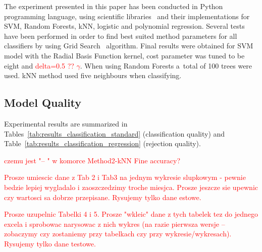 \documentclass{llncs}
\begin{document}
The experiment presented in this paper has been conducted in Python programming language, using scientific libraries~\cite{NumPy,Scikit} and their implementations for SVM, Random Forests, kNN, logistic and polynomial regression. Several tests have been performed in order to find best suited method parameters for all classifiers by using Grid Search~\cite{Scikit} algorithm. Final results were obtained for SVM model with the Radial Basis Function kernel, cost parameter was tuned to be eight and \textcolor{red}{delta=0.5 ?? $\gamma$}. When using Random Forests a~total of 100 trees were used. kNN method used five neighbours when classifying. 


\subsection{Model Quality}
	\label{subsec:rejection_quality}

Experimental results are summarized in Tables~\ref{tab:results_classification_standard} (classification quality) and Table~\ref{tab:results_classification_regression} (rejection quality). 

\textcolor{red}{czemu jest "-- " w komorce Method2-kNN Fine accuracy?}

\textcolor{red}{Prosze umiescic dane z Tab 2 i Tab3 na jednym wykresie slupkowym - pewnie bedzie lepiej wygladalo i zaoszczedzimy troche miesjca. Prosze jeszcze sie upewnic czy wartosci sa dobrze przepisane. Rysujemy tylko dane estowe.}

\textcolor{red}{Prosze uzupelnic Tabelki 4 i 5. Prosze "wkleic" dane z tych tabelek tez do jednego excela i sprobowac narysowac z nich wykres (na razie pierwsza wersje -- zobaczymy czy zostaniemy przy tabelkach czy przy wykresie/wykresach). Rysujemy tylko dane testowe. }
\end{document}
